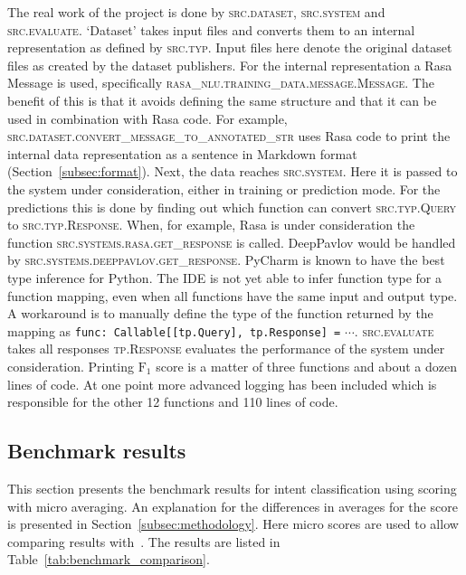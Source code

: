 The real work of the project is done by \textsc{src.dataset}, \textsc{src.system} and \textsc{src.evaluate}.
`Dataset' takes input files and converts them to an internal representation as defined by \textsc{src.typ}.
Input files here denote the original dataset files as created by the dataset publishers.
For the internal representation a Rasa Message is used, specifically \textsc{rasa\_nlu.training\_data.message.Message}.
The benefit of this is that it avoids defining the same structure and that it can be used in combination with Rasa code.
For example, \textsc{src.dataset.convert\_message\_to\_annotated\_str} uses Rasa code to print the internal data representation as a sentence in Markdown format (Section~\ref{subsec:format}).
Next, the data reaches \textsc{src.system}.
Here it is passed to the system under consideration, either in training or prediction mode.
For the predictions this is done by finding out which function can convert \textsc{src.typ.Query} to \textsc{src.typ.Response}.
When, for example, Rasa is under consideration the function \textsc{src.systems.rasa.get\_response} is called.
DeepPavlov would be handled by \textsc{src.systems.deeppavlov.get\_response}.
PyCharm is known to have the best type inference for Python.
The IDE is not yet able to infer function type for a function mapping, even when all functions have the same input and output type.
A workaround is to manually define the type of the function returned by the mapping as \verb|func: Callable[[tp.Query], tp.Response] =| $\cdots$.
\textsc{src.evaluate} takes all responses \textsc{tp.Response} evaluates the performance of the system under consideration.
Printing $\text{F}_1$ score is a matter of three functions and about a dozen lines of code.
At one point more advanced logging has been included which is responsible for the other 12 functions and 110 lines of code.

\subsection{Benchmark results}
\label{subsec:benchmark_results}
This section presents the benchmark results for intent classification using \fone scoring with micro averaging.
An explanation for the differences in averages for the \fone score is presented in Section~\ref{subsec:methodology}.
Here micro \fone scores are used to allow comparing results with~\citet{braun2017}.
The results are listed in Table~\ref{tab:benchmark_comparison}.

